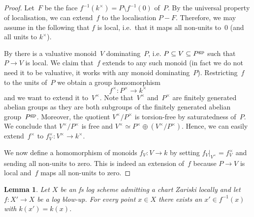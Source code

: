 \documentclass[a4paper,twoside,11pt,reqno]{amsart}
\newcommand{\gp}{{\rm gp}}
\newtheorem{lem}[thm]{Lemma}
\theoremstyle{definition}
\numberwithin{equation}{subsection}
\begin{document}
\begin{proof}
    Let~$F$ be the face $f^{-1}(k^\times) = P \setminus f^{-1}(0)$ of~$P$.
    By the universal property of localisation, we can extend~$f$ to the localisation $P-F$.
    Therefore, we may assume in the following that $f$ is local, i.e.\ that it maps all non-units to~$0$ (and all units to $k^\times$).

    By \cite[Proposition~I.2.4.1]{Ogus} there is a valuative monoid~$V$ dominating~$P$, i.e. $P \subseteq V \subseteq P^\gp$ such that $P \to V$ is local.
    We claim that~$f$ extends to any such monoid (in fact we do not need it to be valuative, it works with any monoid dominating~$P$).
    Restricting~$f$ to the units of~$P$ we obtain a group homomorphism
    \[
        f^\times \colon P^\times \longrightarrow k^\times
    \]
    and we want to extend it to~$V^\times$.
    Note that~$V^\times$ and~$P^\times$ are finitely generated abelian groups as they are both subgroups of the finitely generated abelian group~$P^\gp$.
    Moreover, the quotient $V^\times/P^\times$ is torsion-free by saturatedness of~$P$.
    We conclude that $V^\times/P^\times$ is free and $V^\times \simeq P^\times \oplus (V^\times/P^\times)$.
    Hence, we can easily extend~$f^\times$ to $f_V^\times \colon V^\times \to k^\times$.

    We now define a homomorphism of monoids $f_V \colon V \to k$  by setting $f_V|_{V^\times} = f_V^\times$ and sending all non-units to zero.
    This is indeed an extension of~$f$ because $P \to V$ is local and~$f$ maps all non-units to zero.
\end{proof}

\begin{lem} \label{lem:log-blowup-fibres}
    Let $X$ be an fs log scheme admitting a chart Zariski locally and let $f\colon X'\to X$ be a log blow-up.
    For every point $x\in X$ there exists an $x'\in f^{-1}(x)$ with $k(x')=k(x)$.
\end{lem}
\end{document}
